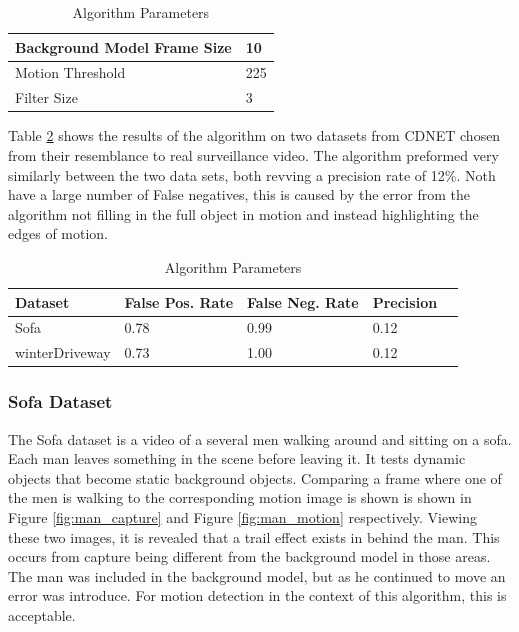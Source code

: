 \documentclass[journal]{IEEEtran}
\begin{document}
\begin{table}[h]
\caption{Algorithm Parameters}
\label{table:param}
\centering
\begin{tabular}{|l|l|}
\hline
Background Model Frame Size & 10  \\ \hline
Motion Threshold            & 225 \\ \hline
Filter Size                 & 3   \\ \hline
\end{tabular}
\end{table}

Table \ref{table:cdnet_score} shows the results of the algorithm on two datasets from CDNET chosen
from their resemblance to real surveillance video. The algorithm preformed very similarly between
the two data sets, both revving a precision rate of 12\%. Noth have a large number of False
negatives, this is caused by the error from the algorithm not filling in the full object in motion
and instead highlighting the edges of motion.

\begin{table}[t]
\centering
\caption{Algorithm Parameters}
\label{table:cdnet_score}
\begin{tabular}{|l|l|l|l|l|}
\hline
\textbf{Dataset} & \textbf{False Pos. Rate} & \textbf{False Neg. Rate} & \textbf{Precision} \\ \hline
Sofa & 0.78                     & 0.99                    & 0.12               \\ \hline
winterDriveway  & 0.73          & 1.00             & 0.12               \\ \hline
\end{tabular}
\end{table}


\subsubsection{Sofa Dataset}
The Sofa dataset is a video of a several men walking around and sitting on a sofa. Each man leaves something
in the scene before leaving it. It tests dynamic objects that become static background objects. Comparing a frame
where one of the men is walking to the corresponding motion image is shown is shown in Figure \ref{fig:man_capture} and Figure \ref{fig:man_motion} respectively. Viewing these two images, it is revealed
that a trail effect exists in behind the man. This occurs from capture being different from the background model
in those areas. The man was included in the background model, but as he continued to move an error was introduce. For motion detection in the context of this algorithm, this is acceptable.
\end{document}
